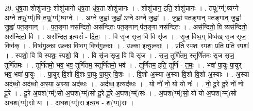 \documentclass[17pt]{extarticle}
\begin{document}
29. धृ॒ष॒ता शोशु॑चानः॒ शोशु॑चानो धृष॒ता धृ॑ष॒ता शोशु॑चानः । . शोशु॑चान॒ इति॒ शोशु॑चानः । . तपू(ग्ग्॑)ष्यग्ने अग्ने॒ तपू(ग्म्॑)षि॒ तपू(ग्ग्॑)ष्यग्ने । . अ॒ग्ने॒ जु॒ह्वा॑ जु॒ह्वा᳚ ऽग्ने अग्ने जु॒ह्वा᳚ । . जु॒ह्वा॑ पत॒ङ्गान् प॑त॒ङ्गान् जु॒ह्वा॑ जु॒ह्वा॑ पत॒ङ्गान् । . प॒त॒ङ्गा नस॑न्दितो॒ अस॑न्दितः पत॒ङ्गान् प॑त॒ङ्गा नस॑न्दितः । . अस॑न्दितो॒ वि व्यस॑न्दितो॒ अस॑न्दितो॒ वि । . अस॑न्दित॒ इत्यसं᳚ - दि॒तः॒ । . वि सृ॑ज सृज॒ वि वि सृ॑ज । . सृ॒ज॒ विष्व॒ग् विष्व॑ख् सृज सृज॒ विष्व॑क् । . विष्व॑गु॒ल्का उ॒ल्का विष्व॒ग् विष्व॑गु॒ल्काः । . उ॒ल्का इत्यु॒ल्काः । . प्रति॒ स्पशः॒ स्पशः॒ प्रति॒ प्रति॒ स्पशः॑ । . स्पशो॒ वि वि स्पशः॒ स्पशो॒ वि । . वि सृ॑ज सृज॒ वि वि सृ॑ज । . सृ॒ज॒ तूर्णि॑तम॒ स्तूर्णि॑तमः सृज सृज॒ तूर्णि॑तमः । . तूर्णि॑तमो॒ भव॒ भव॒ तूर्णि॑तम॒ स्तूर्णि॑तमो॒ भव॑ । . तूर्णि॑तम॒ इति॒ तूर्णि॑ - त॒मः॒ । . भवा॑ पा॒युः पा॒युर् भव॒ भवा॑ पा॒युः । . पा॒युर् वि॒शो वि॒शः पा॒युः पा॒युर् वि॒शः । . वि॒शो अ॒स्या अ॒स्या वि॒शो वि॒शो अ॒स्याः । . अ॒स्या अद॑ब्धो॒ अद॑ब्धो अ॒स्या अ॒स्या अद॑ब्धः । . अद॑ब्ध॒ इत्यद॑ब्धः । . यो नो॑ नो॒ यो यो नः॑ । . नो॒ दू॒रे दू॒रे नो॑ नो दू॒रे । . दू॒रे अ॒घश(ग्म्॑)सो अ॒घश(ग्म्॑)सो दू॒रे दू॒रे अ॒घश(ग्म्॑)सः । . अ॒घश(ग्म्॑)सो॒ यो यो अ॒घश(ग्म्॑)सो अ॒घश(ग्म्॑)सो॒ यः । . अ॒घश(ग्म्॑)स॒ इत्य॒घ - श॒(ग्म्॒)सः॒ । \newline
\end{document}
